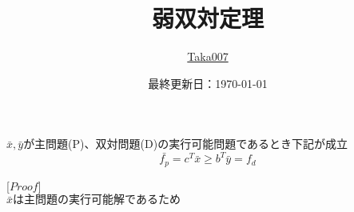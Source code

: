 \documentclass{ltjsarticle}
\title{弱双対定理}
\author{\href{https://github.com/Taka0007}{Taka007}}
\date{最終更新日：\today}
\renewenvironment{leftbar}{%
  \renewcommand\FrameCommand{\vrule width 1pt \hspace{10pt}}%
  \MakeFramed {\advance\hsize-\width \FrameRestore}}%
 {\endMakeFramed}
\newcommand{\barquo}[1]{\begin{leftbar} \noindent #1 \end{leftbar}} %
\begin{document}
\maketitle


\barquo{
$\bar{x}, \bar{y}$が主問題(P)、双対問題(D)の実行可能問題であるとき下記が成立 \\
$$
\bar{f_p} = c^T \bar{x} \geq b^T \bar{y} = {f_d}
$$
}

[$Proof$] \\
$
\bar{x}は主問題の実行可能解であるため
$
\end{document}
